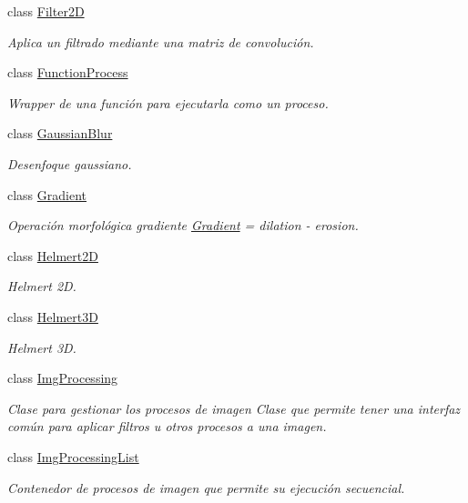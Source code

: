 \begin{DoxyCompactItemize}
class \hyperlink{class_i3_d_1_1_filter2_d}{Filter2D}
\begin{DoxyCompactList}\small\item\em Aplica un filtrado mediante una matriz de convolución. \end{DoxyCompactList}\item 
class \hyperlink{class_i3_d_1_1_function_process}{Function\+Process}
\begin{DoxyCompactList}\small\item\em Wrapper de una función para ejecutarla como un proceso. \end{DoxyCompactList}\item 
class \hyperlink{class_i3_d_1_1_gaussian_blur}{Gaussian\+Blur}
\begin{DoxyCompactList}\small\item\em Desenfoque gaussiano. \end{DoxyCompactList}\item 
class \hyperlink{class_i3_d_1_1_gradient}{Gradient}
\begin{DoxyCompactList}\small\item\em Operación morfológica gradiente \hyperlink{class_i3_d_1_1_gradient}{Gradient} = dilation -\/ erosion. \end{DoxyCompactList}\item 
class \hyperlink{class_i3_d_1_1_helmert2_d}{Helmert2D}
\begin{DoxyCompactList}\small\item\em Helmert 2D. \end{DoxyCompactList}\item 
class \hyperlink{class_i3_d_1_1_helmert3_d}{Helmert3D}
\begin{DoxyCompactList}\small\item\em Helmert 3D. \end{DoxyCompactList}\item 
class \hyperlink{class_i3_d_1_1_img_processing}{Img\+Processing}
\begin{DoxyCompactList}\small\item\em Clase para gestionar los procesos de imagen Clase que permite tener una interfaz común para aplicar filtros u otros procesos a una imagen. \end{DoxyCompactList}\item 
class \hyperlink{class_i3_d_1_1_img_processing_list}{Img\+Processing\+List}
\begin{DoxyCompactList}\small\item\em Contenedor de procesos de imagen que permite su ejecución secuencial. \end{DoxyCompactList}\item 

\end{DoxyCompactItemize}
